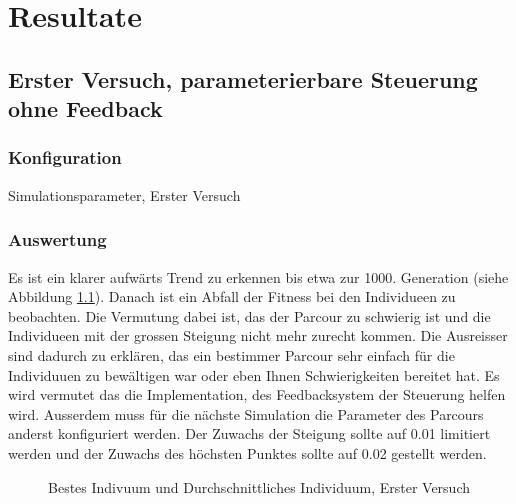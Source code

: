 %
%


\chapter{Resultate\label{chap:Resulate}}

\section{Erster Versuch, parameterierbare Steuerung ohne Feedback}

  \subsection{Konfiguration}
    \begin{table}[H]
      
      \caption{Simulationsparameter, Erster Versuch}
    \end{table}

  \subsection{Auswertung}
    Es ist ein klarer aufwärts Trend zu erkennen bis etwa zur 1000. Generation (siehe Abbildung \ref{fig:graphFirst}).
    Danach ist ein Abfall der Fitness bei den Individueen zu beobachten.
    Die Vermutung dabei ist, das der Parcour zu schwierig ist und die Individueen
    mit der grossen Steigung nicht mehr zurecht kommen. Die Ausreisser sind dadurch zu erklären,
    das ein bestimmer Parcour sehr einfach für die Individuuen zu bewältigen war oder eben Ihnen Schwierigkeiten bereitet hat.
    Es wird vermutet das die Implementation, des Feedbacksystem der Steuerung helfen wird.
    Ausserdem muss für die nächste Simulation die Parameter des Parcours anderst konfiguriert werden.
    Der Zuwachs der Steigung sollte auf 0.01 limitiert werden und der Zuwachs des höchsten Punktes
    sollte auf 0.02 gestellt werden.
      \begin{figure}
        
        \caption{Bestes Indivuum und Durchschnittliches Individuum, Erster Versuch}
        \label{fig:graphFirst}
      \end{figure}

